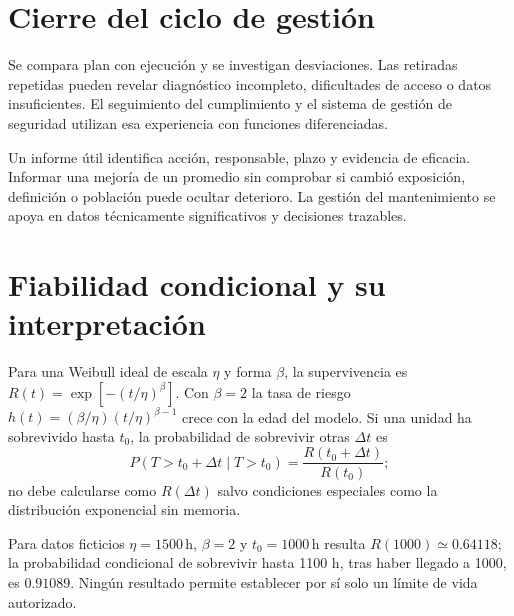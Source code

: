 \section{Cierre del ciclo de gestión}
Se compara plan con ejecución y se investigan desviaciones. Las retiradas repetidas pueden revelar diagnóstico incompleto, dificultades de acceso o datos insuficientes. El seguimiento del cumplimiento y el sistema de gestión de seguridad utilizan esa experiencia con funciones diferenciadas.

Un informe útil identifica acción, responsable, plazo y evidencia de eficacia. Informar una mejoría de un promedio sin comprobar si cambió exposición, definición o población puede ocultar deterioro. La gestión del mantenimiento se apoya en datos técnicamente significativos y decisiones trazables.
\section{Fiabilidad condicional y su interpretación}
Para una Weibull ideal de escala $\eta$ y forma $\beta$, la supervivencia es $R(t)=\exp[-(t/\eta)^\beta]$. Con $\beta=2$ la tasa de riesgo $h(t)=(\beta/\eta)(t/\eta)^{\beta-1}$ crece con la edad del modelo. Si una unidad ha sobrevivido hasta $t_0$, la probabilidad de sobrevivir otras $\Delta t$ es
\[
P(T>t_0+\Delta t\mid T>t_0)=\frac{R(t_0+\Delta t)}{R(t_0)};
\]
no debe calcularse como $R(\Delta t)$ salvo condiciones especiales como la distribución exponencial sin memoria.

Para datos ficticios $\eta=1500\,\mathrm h$, $\beta=2$ y $t_0=1000\,\mathrm h$ resulta $R(1000)\simeq0.64118$; la probabilidad condicional de sobrevivir hasta 1100 h, tras haber llegado a 1000, es $0.91089$. Ningún resultado permite establecer por sí solo un límite de vida autorizado.


